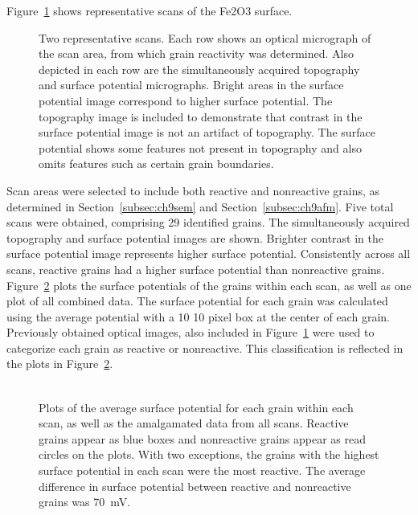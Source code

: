 \documentclass[12pt,%
              twoside,
               letterpaper]{uiothesis}
\begin{document}
Figure~\ref{fig:fe2o3kfmscans} shows representative  scans of the Fe2O3 surface.
\begin{figure}
	\caption[Two representative  scans]{%
		Two representative  scans. Each row shows an optical micrograph of the
scan area, 
		from which grain reactivity was determined. Also depicted in each row are the simultaneously 
		acquired topography and surface potential micrographs. Bright areas in the surface
		potential image correspond to higher surface potential. The topography image is
		included to demonstrate that contrast in the surface potential image is not an artifact of
		topography. The surface potential shows some features not present in topography and also 
		omits features such as certain grain boundaries.}
	\label{fig:fe2o3kfmscans}
\end{figure}
Scan areas were selected to include both reactive and nonreactive grains, as determined in
Section~\ref{subsec:ch9sem} and Section~\ref{subsec:ch9afm}. Five total scans were obtained,
comprising 29 identified grains. The simultaneously acquired topography and surface
potential images are shown. Brighter contrast in the surface potential image represents
higher surface potential. Consistently across all scans, reactive grains had a higher
surface potential than nonreactive grains. Figure~\ref{fig:fe2o3kfmplots} plots the surface
potentials of the grains within each scan, as well as one plot of all combined data. The
surface potential for each grain was calculated using the average potential with a 10
\texttimes{} 10 pixel box at the center of each grain. Previously obtained optical images,
also included in Figure~\ref{fig:fe2o3kfmscans} were used to categorize each grain as reactive
or nonreactive. This classification is reflected in the plots in
Figure~\ref{fig:fe2o3kfmplots}.
\begin{figure}
\centering
$\begin{array}{cc}
\end{array}$
\caption[Average surface potential for each grain]{Plots of the average surface potential
for each grain within each scan, as well as the amalgamated data from all scans. Reactive
grains appear as blue boxes and nonreactive grains appear as read circles on the plots.
With two exceptions, the grains with the highest surface potential in each scan were the
most reactive. The average difference in surface potential between reactive and
nonreactive grains was \SI{70}{\milli\volt}.}
\label{fig:fe2o3kfmplots}
\end{figure}
\end{document}
